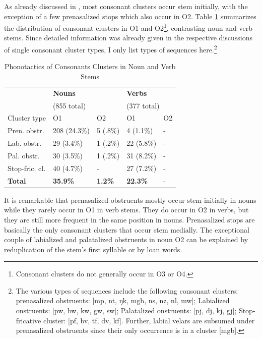 As already discussed in , most consonant clusters occur stem initially, with the exception of a few prenasalized stops which also occur in O2. Table \ref{Tab:CClust} summarizes the distribution of consonant clusters in O1 and O2\footnote{Consonant clusters do not generally occur in O3 or O4.}, contrasting noun and verb stems. Since detailed information was already given in the respective discussions of single consonant cluster types, I only list types of sequences here.\footnote{The various types of sequences include the following consonant clusters: prenasalized obstruents: [mp, nt, ŋk, mgb, ns, nz, nl, mw]; Labialized onstruents: [pw, bw, kw, gw, sw]; Palatalized onstruents: [pj, dj, kj, gj]; Stop-fricative cluster: [pf, bv, tf, dv, kf]. Further,  labial velars are subsumed under prenasalized obstruents since their only occurrence is in a cluster [mgb].}

\begin{table} 
\centering
\begin{tabular}{lll|ll}
 \midrule

 & \multicolumn{2}{l|}{{\bfseries Nouns}}  & \multicolumn{2}{l}{{\bfseries Verbs}}   \\
 & \multicolumn{2}{l|}{(855 total)}  & \multicolumn{2}{l}{(377 total)}   \\  \midrule
Cluster type & O1 & O2 & O1 & O2 \\  \midrule
Pren. obstr. & 208 (24.3\%) & 5 (.8\%) & 4 (1.1\%) & - \\
Lab. obstr. & 29 (3.4\%) & 1 (.2\%)  & 22 (5.8\%) & - \\
Pal. obstr. & 30 (3.5\%) & 1 (.2\%) & 31 (8.2\%) & - \\
Stop-fric. cl. & 40 (4.7\%) & - & 27 (7.2\%) & - \\  \midrule
{\bfseries Total} & {\bfseries 35.9\%} & {\bfseries 1.2\%} & {\bfseries 22.3\%} & - \\  \midrule
\end{tabular}
\caption{Phonotactics of Consonants Clusters in Noun and Verb Stems}
\label{Tab:CClust}
\end{table}

It is remarkable that prenasalized obstruents mostly occur stem initially in nouns while they rarely occur in O1 in verb stems. They do occur in O2 in verbs, but they are still more frequent in the same position in nouns. Prenasalized stops are basically the only consonant clusters that occur stem medially. The exceptional couple of labialized and palatalized obstruents in noun O2 can be explained by reduplication of the stem's first syllable or by loan words.

